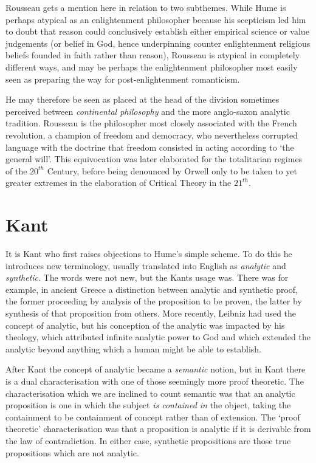 \documentclass[10pt,titlepage]{article}
\begin{document}
Rousseau gets a mention here in relation to two subthemes.
While Hume is perhaps atypical as an enlightenment philosopher because his scepticism led him to doubt that reason could conclusively establish either empirical science or value judgements (or belief in God, hence underpinning counter enlightenment religious beliefs founded in faith rather than reason), Rousseau is atypical in completely different ways, and may be perhaps the enlightenment philosopher most easily seen as preparing the way for post-enlightenment romanticism.\cite{berlinRR}


He may therefore be seen as placed at the head of the division sometimes perceived between \emph{continental philosophy} and the more anglo-saxon analytic tradition.
Rousseau is the philosopher most closely associated with the French revolution, a champion of freedom and democracy, who nevertheless corrupted language with the doctrine that freedom consisted in acting according to `the general will'.
This equivocation was later elaborated for the totalitarian regimes of the $20^{th}$ Century, before being denounced by Orwell \cite{orwell-1984} only to be taken to yet greater extremes in the elaboration of Critical Theory in the $21^{th}$.


\section{Kant}

It is Kant who first raises objections to Hume's simple scheme.
To do this he introduces new terminology, usually translated into English as \emph{analytic} and \emph{synthetic}.
The words were not new, but the Kants usage was.
There was for example, in ancient Greece a distinction between analytic and synthetic proof, the former proceeding by analysis of the proposition to be proven, the latter by synthesis of that proposition from others.
More recently, Leibniz had used the concept of analytic, but his conception of the analytic was impacted by his theology, which attributed infinite analytic power to God and which extended the analytic beyond anything which a human might be able to establish.

After Kant the concept of analytic became a \emph{semantic} notion, but in Kant there is a dual characterisation with one of those seemingly more proof theoretic.
The characterisation which we are inclined to count semantic was that an analytic proposition is one in which the subject \emph{is contained in} the object, taking the containment to be containment of concept rather than of extension.
The `proof theoretic' characterisation was that a proposition is analytic if it is derivable from the law of contradiction.
In either case, synthetic propositions are those true propositions which are not analytic.
\end{document}
